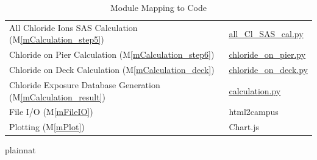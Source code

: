 \documentclass[12pt, titlepage]{article}
\newcommand{\mref}[1]{M\ref{#1}}
\begin{document}
\begin{table}[h!]
\begin{tabular}{p{} p{}}
All Chloride Ions SAS Calculation (\mref{mCalculation_step5}) & \href{https://github.com/smiths/BridgeChlorideExposurePredictor/blob/main/src/database/all_Cl_SAS_cal.py} {all\_Cl\_SAS\_cal.py}\\
Chloride on Pier Calculation (\mref{mCalculation_step6}) & \href{https://github.com/smiths/BridgeChlorideExposurePredictor/blob/main/src/database/chloride_on_pier.py}{chloride\_on\_pier.py}\\
Chloride on Deck Calculation (\mref{mCalculation_deck}) & \href{https://github.com/smiths/BridgeChlorideExposurePredictor/blob/main/src/database/chloride_on_deck.py}{chloride\_on\_deck.py}\\
Chloride Exposure Database Generation (\mref{mCalculation_result}) & \href{https://github.com/smiths/BridgeChlorideExposurePredictor/blob/main/src/database/calculation.py}{calculation.py}\\
File I/O (\mref{mFileIO}) & html2campus\\
Plotting  (\mref{mPlot}) & Chart.js\\
\bottomrule

\end{tabular}
\caption{Module Mapping to Code}
\label{TbMM2C}
\end{table}

\newpage

 {plainnat}

\end{document}
